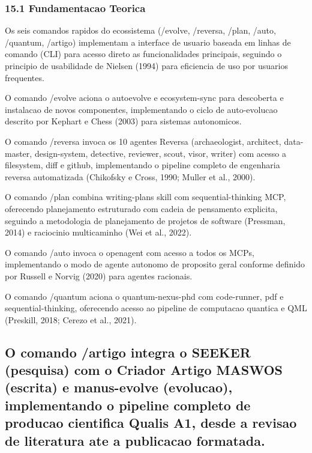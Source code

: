 \documentclass[
  12pt,
]{article}
\begin{document}
\subsubsection{15.1 Fundamentacao
Teorica}\label{fundamentacao-teorica-14}

Os seis comandos rapidos do ecossistema (/evolve, /reversa, /plan,
/auto, /quantum, /artigo) implementam a interface de usuario baseada em
linhas de comando (CLI) para acesso direto as funcionalidades
principais, seguindo o principio de usabilidade de Nielsen (1994) para
eficiencia de uso por usuarios frequentes.

O comando /evolve aciona o autoevolve e ecosystem-sync para descoberta e
instalacao de novos componentes, implementando o ciclo de auto-evolucao
descrito por Kephart e Chess (2003) para sistemas autonomicos.

O comando /reversa invoca os 10 agentes Reversa (archaeologist,
architect, data-master, design-system, detective, reviewer, scout,
visor, writer) com acesso a filesystem, diff e github, implementando o
pipeline completo de engenharia reversa automatizada (Chikofsky e Cross,
1990; Muller et al., 2000).

O comando /plan combina writing-plans skill com sequential-thinking MCP,
oferecendo planejamento estruturado com cadeia de pensamento explicita,
seguindo a metodologia de planejamento de projetos de software
(Pressman, 2014) e raciocinio multicaminho (Wei et al., 2022).

O comando /auto invoca o openagent com acesso a todos os MCPs,
implementando o modo de agente autonomo de proposito geral conforme
definido por Russell e Norvig (2020) para agentes racionais.

O comando /quantum aciona o quantum-nexus-phd com code-runner, pdf e
sequential-thinking, oferecendo acesso ao pipeline de computacao
quantica e QML (Preskill, 2018; Cerezo et al., 2021).

\subsection{O comando /artigo integra o SEEKER (pesquisa) com o Criador
Artigo MASWOS (escrita) e manus-evolve (evolucao), implementando o
pipeline completo de producao cientifica Qualis A1, desde a revisao de
literatura ate a publicacao
formatada.}\label{o-comando-artigo-integra-o-seeker-pesquisa-com-o-criador-artigo-maswos-escrita-e-manus-evolve-evolucao-implementando-o-pipeline-completo-de-producao-cientifica-qualis-a1-desde-a-revisao-de-literatura-ate-a-publicacao-formatada.}
\end{document}
